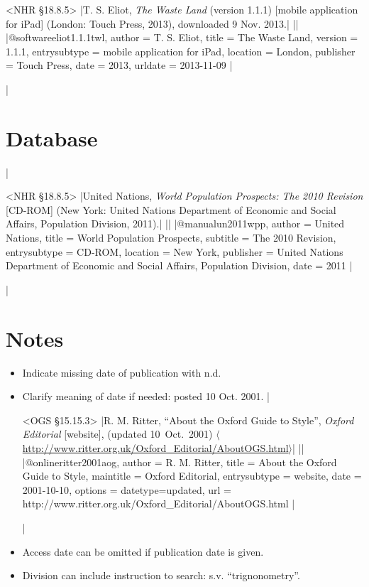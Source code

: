 \documentclass[extrafontsizes,11pt,a4paper,oneside]{memoir}
\begin{document}
\bibexample<NHR \S18.8.5>
|T. S. Eliot, \emph{The Waste Land} (version 1.1.1) [mobile application for iPad] (London: Touch Press, 2013), downloaded 9 Nov. 2013.|%
||%
|@software{eliot1.1.1twl,
  author = {T. S. Eliot},
  title = {The Waste Land},
  version = {1.1.1},
  entrysubtype = {mobile application for iPad},
  location = {London},
  publisher = {Touch Press},
  date = {2013},
  urldate = {2013-11-09}
}|

\todoc|
\section{Database}
|

\bibexample<NHR \S18.8.5>
|United Nations, \emph{World Population Prospects: The 2010 Revision} [CD-ROM] (New York: United Nations Department of Economic and Social Affairs, Population Division, 2011).|%
||%
|@manual{un2011wpp,
  author = {{United Nations}},
  title = {World Population Prospects},
  subtitle = {The 2010 Revision},
  entrysubtype = {CD-ROM},
  location = {New York},
  publisher = {United Nations Department of Economic and Social Affairs, Population Division},
  date = {2011}
}|

\todoc|
\section{Notes}

\begin{itemize}
  \item Indicate missing date of publication with n.d.
  \item Clarify meaning of date if needed: posted 10 Oct. 2001.
|  

\bibexample<OGS \S15.15.3>
|R. M. Ritter, \enquote{About the Oxford Guide to Style}, \emph{Oxford Editorial} [website], (updated 10~Oct.\ 2001) $\langle$\url{http://www.ritter.org.uk/Oxford_Editorial/AboutOGS.html}$\rangle$|%
||%
|@online{ritter2001aog,
  author = {R. M. Ritter},
  title = {About the Oxford Guide to Style},
  maintitle = {Oxford Editorial},
  entrysubtype = {website},
  date = {2001-10-10},
  options = {datetype=updated},
  url = {http://www.ritter.org.uk/Oxford_Editorial/AboutOGS.html}
}|

\todoc|  
  \item Access date can be omitted if publication date is given.
  \item Division can include instruction to search: s.v. \enquote{trignonometry}.
\end{itemize}
\end{document}

